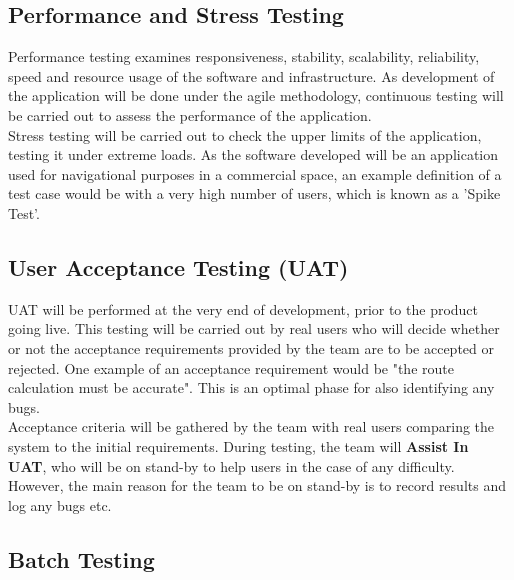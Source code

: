 \documentclass[12pt]{article}
\begin{document}
\subsection{Performance and Stress Testing} %
Performance testing examines responsiveness, stability, scalability, reliability, speed and resource usage of the software and infrastructure. As development of the application will be done under the agile methodology, continuous testing will be carried out to assess the performance of the application.\\

Stress testing will be carried out to check the upper limits of the application, testing it under extreme loads. As the software developed will be an application used for navigational purposes in a commercial space, an example definition of a test case would be with a very high number of users, which is known as a 'Spike Test'.

\subsection{User Acceptance Testing (UAT)} %
UAT will be performed at the very end of development, prior to the product going live. This testing will be carried out by real users who will decide whether or not the acceptance requirements provided by the team are to be accepted or rejected. One example of an acceptance requirement would be "the route calculation must be accurate". This is an optimal phase for also identifying any bugs.\\

Acceptance criteria will be gathered by the team with real users comparing the system to the initial requirements. During testing, the team will \textbf{Assist In UAT}, who will be on stand-by to help users in the case of any difficulty. However, the main reason for the team to be on stand-by is to record results and log any bugs etc.


\subsection{Batch Testing}
\end{document}
